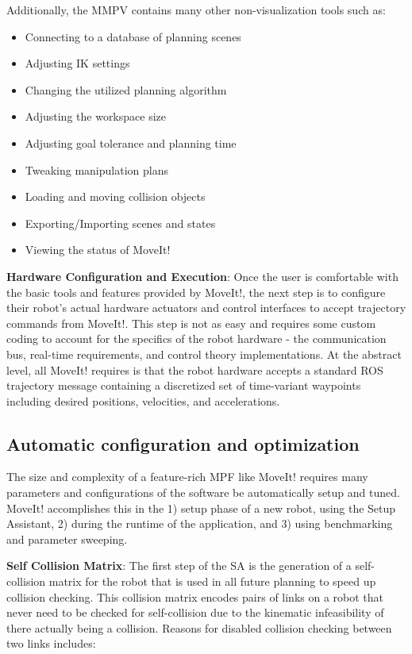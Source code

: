 \documentclass[10pt,journal,compsoc]{joser1}
\begin{document}
{Additionally, the MMPV contains many other non-visualization tools such as:
\begin{itemize}
    \item Connecting to a database of planning scenes
    \item Adjusting IK settings
    \item Changing the utilized planning algorithm
    \item Adjusting the workspace size
    \item Adjusting goal tolerance and planning time
    \item Tweaking manipulation plans
    \item Loading and moving collision objects
    \item Exporting/Importing scenes and states
    \item Viewing the status of MoveIt!
\end{itemize}

{\bf Hardware Configuration and Execution}: Once the user is comfortable with the basic tools and features provided by MoveIt!, the next step is to configure their robot's actual hardware actuators and control interfaces to accept trajectory commands from MoveIt!. This step is not as easy and requires some custom coding to account for the specifics of the robot hardware - the communication bus, real-time requirements, and control theory implementations. At the abstract level, all MoveIt! requires is that the robot hardware accepts a standard ROS trajectory message containing a discretized set of time-variant waypoints including desired positions, velocities, and accelerations.  

\subsection{Automatic configuration and optimization}

The size and complexity of a feature-rich MPF like MoveIt! requires many parameters and configurations of the software be automatically setup and tuned. MoveIt! accomplishes this in the 1) setup phase of a new robot, using the Setup Assistant, 2) during the runtime of the application, and 3) using benchmarking and parameter sweeping.

{\bf Self Collision Matrix}: The first step of the SA is the generation of a self-collision matrix for the robot that is used in all future planning to speed up collision checking. This collision matrix encodes pairs of links on a robot that never need to be checked for self-collision due to the kinematic infeasibility of there actually being a collision. Reasons for disabled collision checking between two links includes:
 
}
\end{document}
